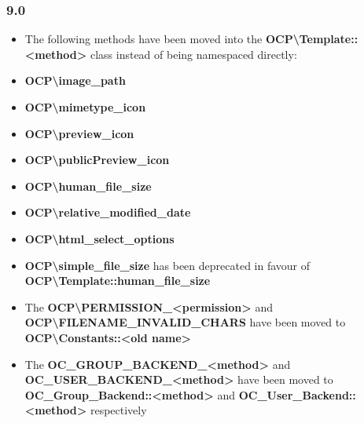 \documentclass[letterpaper,10pt,english]{sphinxmanual}
\begin{document}
\subsubsection{9.0}
\label{app/changelog:id3}\begin{itemize}
\item {} 
The following methods have been moved into the \textbf{OCP\textbackslash{}Template::\textless{}method\textgreater{}} class instead of being namespaced directly:

\end{itemize}
\begin{itemize}
\item {} 
\textbf{OCP\textbackslash{}image\_path}

\item {} 
\textbf{OCP\textbackslash{}mimetype\_icon}

\item {} 
\textbf{OCP\textbackslash{}preview\_icon}

\item {} 
\textbf{OCP\textbackslash{}publicPreview\_icon}

\item {} 
\textbf{OCP\textbackslash{}human\_file\_size}

\item {} 
\textbf{OCP\textbackslash{}relative\_modified\_date}

\item {} 
\textbf{OCP\textbackslash{}html\_select\_options}

\end{itemize}
\begin{itemize}
\item {} 
\textbf{OCP\textbackslash{}simple\_file\_size} has been deprecated in favour of \textbf{OCP\textbackslash{}Template::human\_file\_size}

\item {} 
The \textbf{OCP\textbackslash{}PERMISSION\_\textless{}permission\textgreater{}} and \textbf{OCP\textbackslash{}FILENAME\_INVALID\_CHARS} have been moved to \textbf{OCP\textbackslash{}Constants::\textless{}old name\textgreater{}}

\item {} 
The \textbf{OC\_GROUP\_BACKEND\_\textless{}method\textgreater{}} and \textbf{OC\_USER\_BACKEND\_\textless{}method\textgreater{}} have been moved to \textbf{OC\_Group\_Backend::\textless{}method\textgreater{}} and \textbf{OC\_User\_Backend::\textless{}method\textgreater{}} respectively

\end{itemize}
\end{document}
